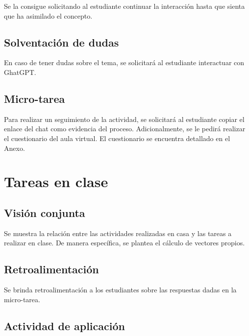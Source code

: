 \documentclass[a4,11pt]{aleph-notas}
\begin{document}
Se la consigue solicitando al estudiante continuar la interacción hasta que sienta que ha asimilado el concepto.

\subsection{Solventación de dudas}

En caso de tener dudas sobre el tema, se solicitará al estudiante interactuar con GhatGPT.

\subsection{Micro-tarea}

Para realizar un seguimiento de la actividad, se solicitará al estudiante copiar el enlace del chat como evidencia del proceso. Adicionalmente, se le pedirá realizar el cuestionario del aula virtual. El cuestionario se encuentra detallado en el Anexo.

\section{Tareas en clase}

\subsection{Visión conjunta}

Se muestra la relación entre las actividades realizadas en casa y las tareas a realizar en clase. De manera específica, se plantea el cálculo de vectores propios.

\subsection{Retroalimentación}

Se brinda retroalimentación a los estudiantes sobre las respuestas dadas en la micro-tarea.

\subsection{Actividad de aplicación}
\end{document}
